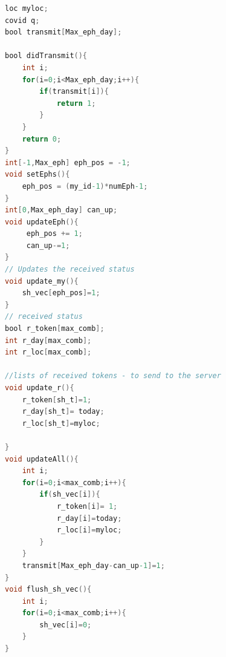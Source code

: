 \documentclass[a4paper, twocolumn]{article}
\begin{document}
\begin{lstlisting}[language=C, caption= User's Declarations,label={ldUser},xleftmargin=.02\textwidth]
loc myloc;
covid q;
bool transmit[Max_eph_day];

bool didTransmit(){
    int i;
    for(i=0;i<Max_eph_day;i++){
        if(transmit[i]){
            return 1;
        }
    }
    return 0;
}
int[-1,Max_eph] eph_pos = -1;
void setEphs(){
    eph_pos = (my_id-1)*numEph-1;  
}
int[0,Max_eph_day] can_up;
void updateEph(){
     eph_pos += 1;
     can_up-=1;
}
// Updates the received status
void update_my(){
    sh_vec[eph_pos]=1;
}
// received status
bool r_token[max_comb];
int r_day[max_comb];
int r_loc[max_comb];

//lists of received tokens - to send to the server
void update_r(){
    r_token[sh_t]=1;
    r_day[sh_t]= today;
    r_loc[sh_t]=myloc;

}
void updateAll(){
    int i;
    for(i=0;i<max_comb;i++){
        if(sh_vec[i]){
            r_token[i]= 1;
            r_day[i]=today;
            r_loc[i]=myloc;
        }
    }
    transmit[Max_eph_day-can_up-1]=1;
}
void flush_sh_vec(){
    int i;
    for(i=0;i<max_comb;i++){
        sh_vec[i]=0;
    }
}
\end{lstlisting}
\end{document}
